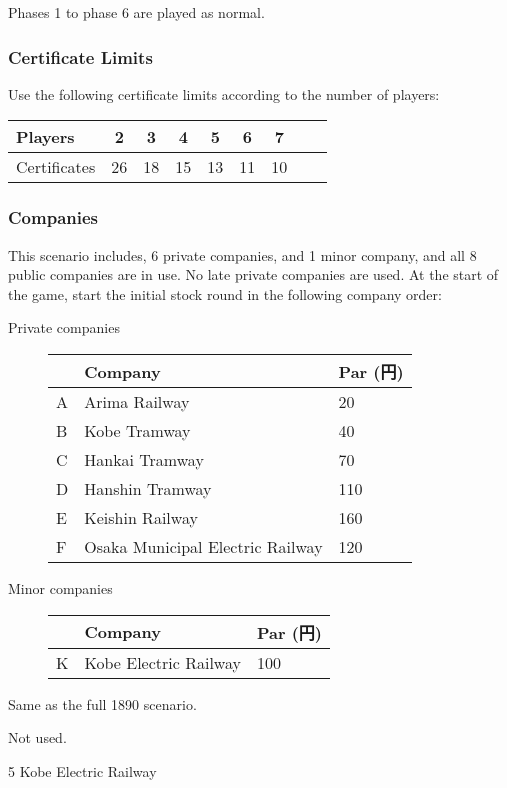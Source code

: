 \begin{multicols}{2}
Phases 1 to phase 6 are played as normal.

\subsubsection{Certificate Limits}
Use the following certificate limits according to the number of players:

\begin{tabular}{l|cccccccc}
Players & 2 & 3 & 4 & 5 & 6 & 7\\
\hline
Certificates & 26 & 18 & 15 & 13 & 11 & 10 \\
\end{tabular}
\columnbreak
\subsubsection{Companies}

This scenario includes, 6 private companies, and 1 minor company, and
all 8 public companies are in use. No late private companies are
used. At the start of the game, start the initial stock round in the
following company order:

\begin{description}
\item[Private companies] \hfill

\begin{tabular}{lp{4cm}l}
 & Company & Par (円) \\
\hline
A & Arima Railway & 20\\
B & Kobe Tramway & 40\\
C & Hankai Tramway & 70 \\
D & Hanshin Tramway & 110\\
E & Keishin Railway & 160\\
F & Osaka Municipal Electric Railway & 120
\end{tabular}
\item[Minor companies] \hfill

\begin{tabular}{lp{4cm}l}
 & Company & Par (円) \\ \hline
K & Kobe Electric Railway & 100
\end{tabular}
\end{description}

Same as the full 1890 scenario.

Not used.

\begin{description}
\item[5 Kobe Electric Railway]\hfill


\end{description}
\end{multicols}

